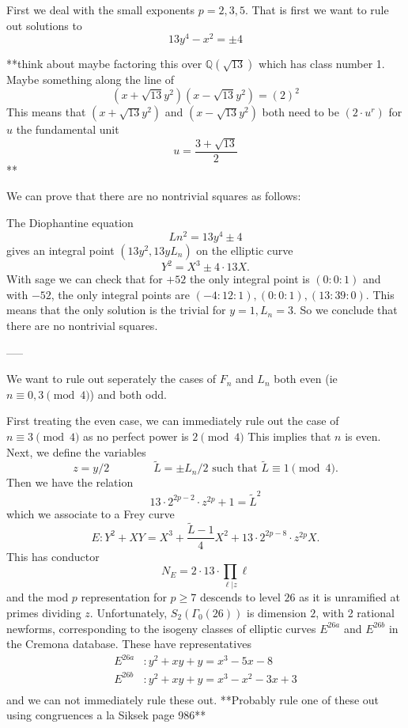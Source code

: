\documentclass[12pt]{article}
\def\Q{{\mathbb Q}}
\begin{document}
\begin{enumerate}
First we deal with the small exponents $p = 2,3,5$.  That is first we want to rule out solutions to
\[ 13y^{4} -x^{2} = \pm 4 \]

**think about maybe factoring this over $\Q(\sqrt{13})$ which has class number 1.  Maybe something along the line of 
\[ (x + \sqrt{13} y^2)(x - \sqrt{13}y^2) = (2)^2 \]
This means that $(x+\sqrt{13}y^2)$ and $(x-\sqrt{13}y^2)$ both need to be $(2 \cdot u^r)$ for $u$ the fundamental unit 
\[ u = \frac{3 + \sqrt{13}}{2} \]
**

We can prove that there are no nontrivial squares as follows:

The Diophantine equation
\[ Ln^2 = 13y^4 \pm 4\]
gives an integral point $(13y^2, 13yL_n)$ on the elliptic curve
\[ Y^2 = X^3 \pm 4 \cdot 13 X .\]
With sage we can check that for $+52$ the only integral point is $(0:0:1)$ and with $-52$, the only integral points are $(-4:12:1), (0:0:1), (13:39:0)$.  This means that the only solution is the trivial for $y = 1, L_n = 3$.   So we conclude that there are no nontrivial squares.



-----


We want to rule out seperately the cases of $F_n$ and $L_n$ both even (ie $n \equiv 0,3 \pmod{4}$) and both odd.

First treating the even case, we can immediately rule out the case of $n \equiv 3 \pmod{4}$ as no perfect power is $2 \pmod{4}$  This implies that $n$ is even.  Next, we define the variables
\[ z = y/2 \qquad \qquad \tilde{L} = \pm L_n/2 \text{ such that } \tilde{L} \equiv 1 \pmod{4}. \]
Then we have the relation
\[ 13 \cdot 2^{2p-2} \cdot z^{2p}+1 = \tilde{L}^2 \] 
which we associate to a Frey curve
\[E: Y^2 +XY = X^3 +\frac{\tilde{L}-1}{4} X^2 +13 \cdot 2^{2p-8} \cdot z^{2p} X .\]
This has conductor
\[ N_E = 2 \cdot 13 \cdot \prod_{\ell | z} \ell \]
and the mod $p$ representation for $p \geq 7$ descends to level $26$ as it is unramified at primes dividing $z$.  Unfortunately, $S_2(\Gamma_0(26))$ is dimension $2$, with 2 rational newforms, corresponding to the isogeny classes of elliptic curves $E^{26a}$ and $E^{26b}$ in the Cremona database.  These have representatives
\begin{align*}
E^{26a} & : y^2 + xy + y = x^3 - 5x - 8 \\
E^{26b} & : y^2 + xy + y = x^3 - x^2 - 3x + 3 \\
\end{align*}
and we can not immediately rule these out. **Probably rule one of these out using congruences a la Siksek page 986**



\end{enumerate}
\end{document}
